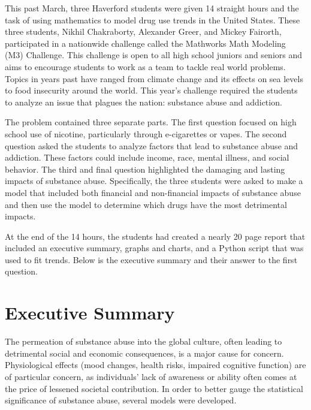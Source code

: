 
This past March, three Haverford students were given 14 straight hours and the task of using mathematics to model drug use trends in the United States. These three students, Nikhil Chakraborty, Alexander Greer, and Mickey Fairorth, participated in a nationwide challenge called the Mathworks Math Modeling (M3) Challenge. This challenge is open to all high school juniors and seniors and aims to encourage students to work as a team to tackle real world problems. Topics in years past have ranged from climate change and its effects on sea levels to food insecurity around the world. This year’s challenge required the students to analyze an issue that plagues the nation: substance abuse and addiction.

The problem contained three separate parts. The first question focused on high school use of nicotine, particularly through e-cigarettes or vapes. The second question asked the students to analyze factors that lead to substance abuse and addiction. These factors could include income, race, mental illness, and social behavior. The third and final question highlighted the damaging and lasting impacts of substance abuse. Specifically, the three students were asked to make a model that included both financial and non-financial impacts of substance abuse and then use the model to determine which drugs have the most detrimental impacts.

At the end of the 14 hours, the students had created a nearly 20 page report that included an executive summary, graphs and charts, and a Python script that was used to fit trends. Below is the executive summary and their answer to the first question.

\section*{Executive Summary}

The permeation of substance abuse into the global culture, often leading to detrimental social and economic consequences, is a major cause for concern. Physiological effects (mood changes, health risks, impaired cognitive function) are of particular concern, as individuals’ lack of awareness or ability often comes at the price of lessened societal contribution. In order to better gauge the statistical significance of substance abuse, several models were developed.

